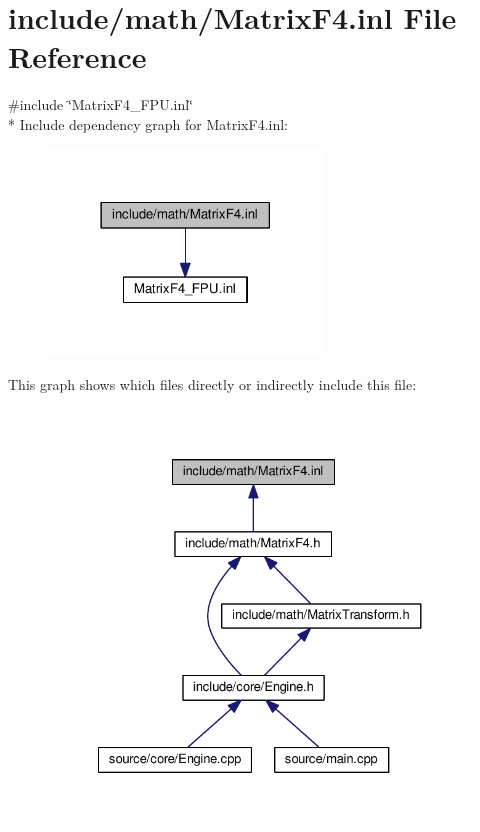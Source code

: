 \hypertarget{MatrixF4_8inl}{\section{include/math/\-Matrix\-F4.inl File Reference}
\label{MatrixF4_8inl}
}
{\ttfamily \#include \char`\"{}Matrix\-F4\-\_\-\-F\-P\-U.\-inl\char`\"{}}\\*
Include dependency graph for Matrix\-F4.\-inl\-:
\nopagebreak
\begin{figure}[H]
\begin{center}
\leavevmode
\includegraphics[width=206pt]{MatrixF4_8inl__incl}
\end{center}
\end{figure}
This graph shows which files directly or indirectly include this file\-:
\nopagebreak
\begin{figure}[H]
\begin{center}
\leavevmode
\includegraphics[width=330pt]{MatrixF4_8inl__dep__incl}
\end{center}
\end{figure}
